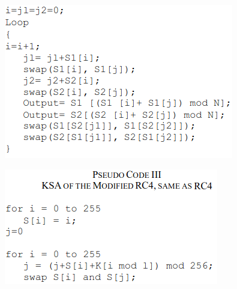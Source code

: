 \documentclass[conference]{IEEEtran}
\begin{document}
\begin{figure}[H]
    \centering
    \includegraphics[width=\linewidth]{code2}
\end{figure}

\begin{figure}[H]
    \centering
    \includegraphics[width=\linewidth]{code3}
\end{figure}
\end{document}
